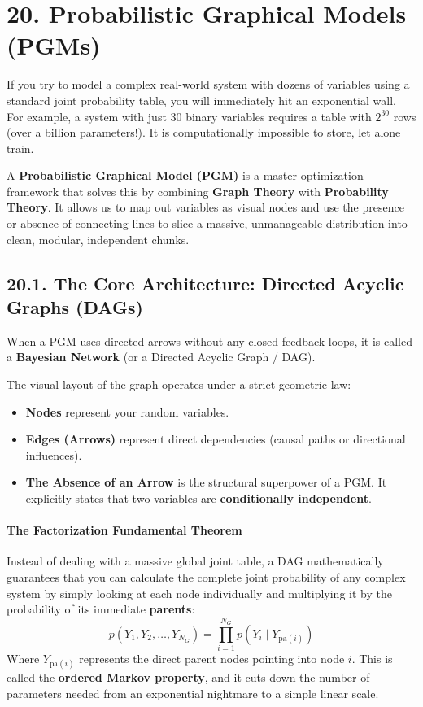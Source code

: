 \documentclass{article}
\begin{document}
\section*{20. Probabilistic Graphical Models (PGMs)}

If you try to model a complex real-world system with dozens of variables using a standard joint probability table, you will immediately hit an exponential wall. For example, a system with just 30 binary variables requires a table with $2^{30}$ rows (over a billion parameters!). It is computationally impossible to store, let alone train.

A \textbf{Probabilistic Graphical Model (PGM)} is a master optimization framework that solves this by combining \textbf{Graph Theory} with \textbf{Probability Theory}. It allows us to map out variables as visual nodes and use the presence or absence of connecting lines to slice a massive, unmanageable distribution into clean, modular, independent chunks.

\subsection*{20.1. The Core Architecture: Directed Acyclic Graphs (DAGs)}
When a PGM uses directed arrows without any closed feedback loops, it is called a \textbf{Bayesian Network} (or a Directed Acyclic Graph / DAG). 

The visual layout of the graph operates under a strict geometric law:
\begin{itemize}
    \item \textbf{Nodes} represent your random variables.
    \item \textbf{Edges (Arrows)} represent direct dependencies (causal paths or directional influences).
    \item \textbf{The Absence of an Arrow} is the structural superpower of a PGM. It explicitly states that two variables are \textbf{conditionally independent}.
\end{itemize}

\paragraph{The Factorization Fundamental Theorem}
Instead of dealing with a massive global joint table, a DAG mathematically guarantees that you can calculate the complete joint probability of any complex system by simply looking at each node individually and multiplying it by the probability of its immediate \textbf{parents}:
\begin{equation}
p(Y_1, Y_2, \dots, Y_{N_G}) = \prod_{i=1}^{N_G} p(Y_i \mid Y_{\text{pa}(i)}) \tag{131}
\end{equation}
Where $Y_{\text{pa}(i)}$ represents the direct parent nodes pointing into node $i$. This is called the \textbf{ordered Markov property}, and it cuts down the number of parameters needed from an exponential nightmare to a simple linear scale.
\end{document}
